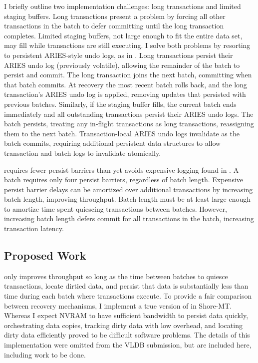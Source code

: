 I briefly outline two implementation challenges: long transactions and limited staging buffers.
Long transactions present a problem by forcing all other transactions in the batch to defer committing until the long transaction completes.
Limited staging buffers, not large enough to fit the entire data set, may fill while transactions are still executing.
I solve both problems by resorting to persistent ARIES-style undo logs, as in \InPlace.
Long transactions persist their ARIES undo log (previously volatile), allowing the remainder of the batch to persist and commit.
The long transaction joins the next batch, committing when that batch commits.
At recovery the most recent batch rolls back, and the long transaction's ARIES undo log is applied, removing updates that persisted with previous batches.
Similarly, if the staging buffer fills, the current batch ends immediately and all outstanding transactions persist their ARIES undo logs.
The batch persists, treating any in-flight transactions as long transactions, reassigning them to the next batch.
Transaction-local ARIES undo logs invalidate as the batch commits, requiring additional persistent data structures to allow transaction and batch logs to invalidate atomically.

\GroupCommit requires fewer persist barriers than \InPlace yet avoids expensive logging found in \NVDisk.
A batch requires only four persist barriers, regardless of batch length.
Expensive persist barrier delays can be amortized over additional transactions by increasing batch length, improving throughput.
Batch length must be at least large enough to amortize time spent quiescing transactions between batches.
However, increasing batch length defers commit for all transactions in the batch, increasing transaction latency.

\subsection{Proposed Work}
\label{sec::OLTP_design:GroupCommit:Proposed}

\GroupCommit only improves throughput so long as the time between batches to quiesce transactions, locate dirtied data, and persist that data is substantially less than time during each batch where transactions execute.
To provide a fair comparison between recovery mechanisms, I implement a true version of \GroupCommit in Shore-MT.
Whereas I expect NVRAM to have sufficient bandwidth to persist data quickly, orchestrating data copies, tracking dirty data with low overhead, and locating dirty data efficiently proved to be difficult software problems.
The details of this implementation were omitted from the VLDB submission, but are included here, including work to be done.

